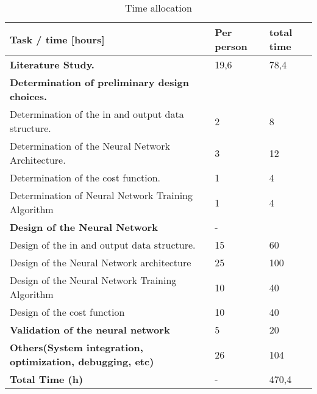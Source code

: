 \begin{table}[h]
	\centering
	\caption{Time allocation}
	\label{tab:timeallocation}
	\begin{tabular}{|l|l|l|} \hline
		Task / time [hours]                                               			& Per person & total time \\ \hline
		\textbf{Literature Study.}                                 			& 19,6    & 78,4          \\
		\textbf{Determination of preliminary design choices.}      			&         &               \\
		Determination of the in and output data structure.         			& 2       & 8             \\
		Determination of the Neural Network Architecture.          			& 3       & 12            \\
		Determination of the cost function.                        			& 1       & 4             \\
		Determination of Neural Network Training Algorithm         			& 1       & 4             \\
		\textbf{Design of the Neural Network}                      			& -       &               \\
		Design of the in and output data structure.                			& 15      & 60            \\
		Design of the Neural Network architecture                  			& 25      & 100           \\
		Design of the Neural Network Training Algorithm            			& 10      & 40            \\
		Design of the cost function                                			& 10      & 40            \\
		\textbf{Validation of the neural network}                  			& 5       & 20            \\
		\textbf{Others(System integration, optimization, debugging, etc)} 	& 26      & 104           \\
		\textbf{Total Time (h)}                                             & -       & 470,4         \\ \hline
	\end{tabular}
\end{table}

